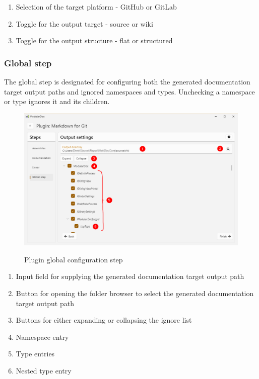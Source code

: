\begin{enumerate}
    \item Selection of the target platform - GitHub or GitLab
    \item Toggle for the output target - source or wiki
    \item Toggle for the output structure - flat or structured
\end{enumerate}

\pagebreak
\subsubsection{Global step}

The global step is designated for configuring both the generated documentation target output paths and ignored namespaces and types.
Unchecking a namespace or type ignores it and its children.

\begin{figure}[H]
    \includegraphics[width=\linewidth]{img/modularDocGlobalSettings.png}
    \label{fig:modularGlobal}
    \caption{Plugin global configuration step}
\end{figure}

\begin{enumerate}
    \item Input field for supplying the generated documentation target output path
    \item Button for opening the folder browser to select the generated documentation target output path
    \item Buttons for either expanding or collapsing the ignore list
    \item Namespace entry
    \item Type entries
    \item Nested type entry
\end{enumerate}


